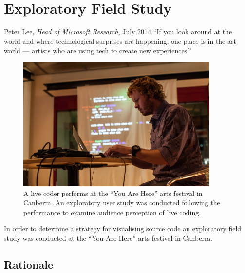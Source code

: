 
\chapter{Exploratory Field Study}
\label{chap:exploratory-field-study}

\begin{chapquote}{Peter Lee, \textit{Head of Microsoft Research}, July 2014}
``If you look around at the world and where technological surprises are happening, one place is in the art world — artists who are using tech to create new experiences.''
\end{chapquote}

\begin{figure}
\centering
\includegraphics[width=0.9\textwidth]{../images/study-1-you-are-here-ben.jpg}
\caption{A live coder performs at the ``You Are Here'' arts festival in Canberra. An exploratory user study was conducted following the performance to examine audience perception of live coding.}
\label{fig:exploratory-field-study-ben}
\end{figure}

In order to determine a strategy for visualising source code an exploratory field study was conducted at the ``You Are Here'' arts festival in Canberra.

\section{Rationale}

